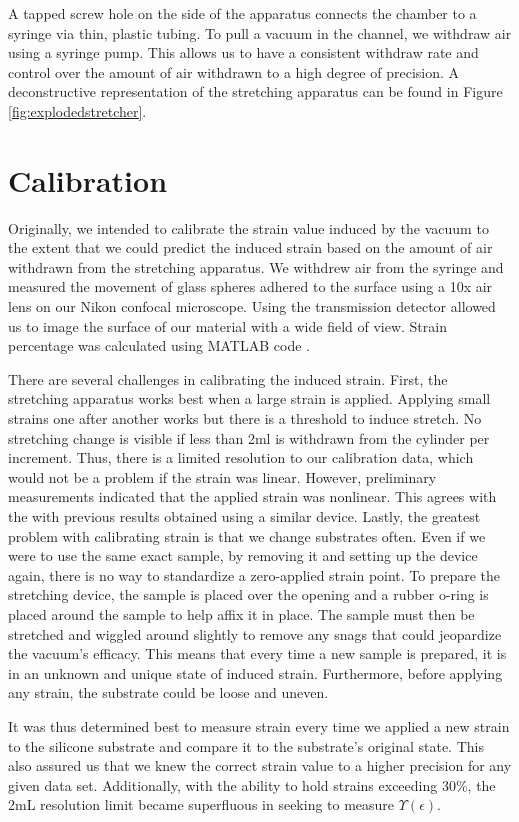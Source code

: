 A tapped screw hole on the side of the apparatus connects the chamber to a syringe via thin, plastic tubing. To pull a vacuum in the channel, we withdraw air using a syringe pump. This allows us to have a consistent withdraw rate and control over the amount of air withdrawn to a high degree of precision. A deconstructive representation of the stretching apparatus can be found in Figure \ref{fig:explodedstretcher}.

\section{Calibration}
Originally, we intended to calibrate the strain value induced by the vacuum to the extent that we could predict the induced strain based on the amount of air withdrawn from the stretching apparatus. We withdrew air from the syringe and measured the movement of glass spheres adhered to the surface using a 10x air lens on our Nikon confocal microscope. Using the transmission detector allowed us to image the surface of our material with a wide field of view. Strain percentage was calculated using MATLAB code \cite{xu2017direct}.

There are several challenges in calibrating the induced strain. First, the stretching apparatus works best when a large strain is applied. Applying small strains one after another works but there is a threshold to induce stretch. No stretching change is visible if less than 2ml is withdrawn from the cylinder per increment. Thus, there is a limited resolution to our calibration data, which would not be a problem if the strain was linear. However, preliminary measurements indicated that the applied strain was nonlinear. This agrees with the with previous results \cite{na2008time} obtained using a similar device. Lastly, the greatest problem with calibrating strain is that we change substrates often. Even if we were to use the same exact sample, by removing it and setting up the device again, there is no way to standardize a zero-applied strain point. To prepare the stretching device, the sample is placed over the opening and a rubber o-ring is placed around the sample to help affix it in place. The sample must then be stretched and wiggled around slightly to remove any snags that could jeopardize the vacuum's efficacy. This means that every time a new sample is prepared, it is in an unknown and unique state of induced strain. Furthermore, before applying any strain, the substrate could be loose and uneven.

It was thus determined best to measure strain every time we applied a new strain to the silicone substrate and compare it to the substrate's original state. This also assured us that we knew the correct strain value to a higher precision for any given data set. Additionally, with the ability to hold strains exceeding 30\%, the 2mL resolution  limit became superfluous in seeking to measure $\Upsilon(\epsilon)$.


